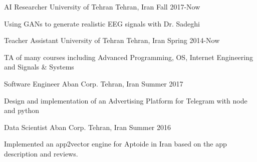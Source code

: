

\begin{cventries}

 \cventry
    {AI Researcher} %
    {University of Tehran} %
    {Tehran, Iran} %
    {Fall 2017-Now} %
    {
      \begin{cvitems} %
        \item {Using GANs to generate realistic EEG signals with Dr. Sadeghi}
      \end{cvitems}
    }

 \cventry
    {Teacher Assistant} %
    {University of Tehran} %
    {Tehran, Iran} %
    {Spring 2014-Now} %
    {
      \begin{cvitems} %
        \item {TA of many courses including Advanced Programming, OS, Internet Engineering and Signals \& Systems}
      \end{cvitems}
    }

 \cventry
    {Software Engineer} %
    {Aban Corp.} %
    {Tehran, Iran} %
    {Summer 2017} %
    {
      \begin{cvitems} %
        \item {Design and implementation of an Advertising Platform for Telegram with node and python}
      \end{cvitems}
    }


  \cventry
    {Data Scientist} %
    {Aban Corp.} %
    {Tehran, Iran} %
    {Summer 2016} %
    {
      \begin{cvitems} %
        \item {Implemented an app2vector engine for Aptoide in Iran based on the app description and reviews.}
      \end{cvitems}
    }


\end{cventries}
